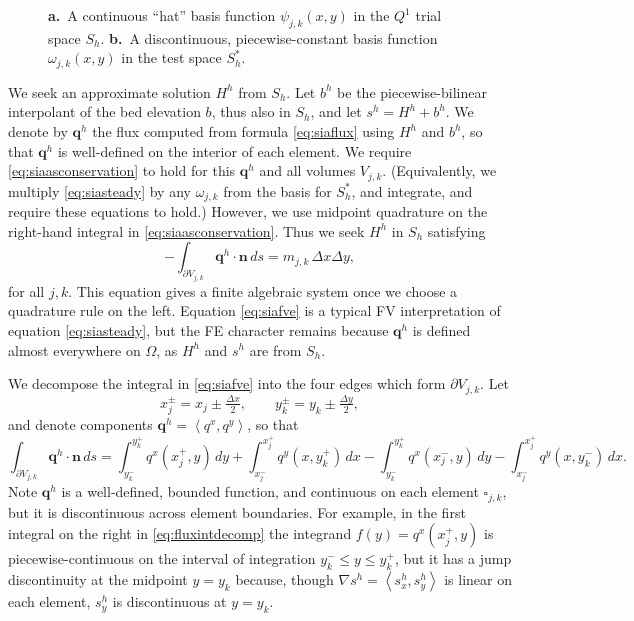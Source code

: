 \documentclass[11pt]{amsart}
\newcommand\bn{\mathbf{n}}
\newcommand\bq{\mathbf{q}}
\newcommand{\grad}{\nabla}
\newcommand{\ip}[2]{\ensuremath{\left<#1,#2\right>}}
\newcommand{\dxtwo}{\tfrac{\Delta x}{2}}
\newcommand{\dytwo}{\tfrac{\Delta y}{2}}
\begin{document}
\begin{figure}[ht]
\begin{center}
 \quad 
\end{center}
\caption{{\large \textbf{a.}}~A continuous ``hat'' basis function $\psi_{j,k}(x,y)$ in the $Q^1$ trial space $S_h$.  {\large \textbf{b.}}~A discontinuous, piecewise-constant basis function $\omega_{j,k}(x,y)$ in the test space $S_h^*$.}
\label{fig:fembases}
\end{figure}

We seek an approximate solution $H^h$ from $S_h$.  Let $b^h$ be the piecewise-bilinear interpolant of the bed elevation $b$, thus also in $S_h$, and let $s^h=H^h+b^h$.  We denote by $\bq^h$ the flux computed from formula \eqref{eq:siaflux} using $H^h$ and $b^h$, so that $\bq^h$ is well-defined on the interior of each element.  We require \eqref{eq:siaasconservation} to hold for this $\bq^h$ and all volumes $V_{j,k}$.  (Equivalently, we multiply \eqref{eq:siasteady} by any $\omega_{j,k}$ from the basis for $S_h^*$, and integrate, and require these equations to hold.)  However, we use midpoint quadrature on the right-hand integral in \eqref{eq:siaasconservation}.  Thus we seek $H^h$ in $S_h$ satisfying
\begin{equation}
  - \int_{\partial V_{j,k}} \bq^h \cdot \bn\,ds = m_{j,k}\, \Delta x \Delta y, \label{eq:siafve}
\end{equation}
for all $j,k$.  This equation gives a finite algebraic system once we choose a quadrature rule on the left.  Equation \eqref{eq:siafve} is a typical FV interpretation of equation \eqref{eq:siasteady}, but the FE character remains because $\bq^h$ is defined almost everywhere on $\Omega$, as $H^h$ and $s^h$ are from $S_h$.

We decompose the integral in \eqref{eq:siafve} into the four edges which form $\partial V_{j,k}$.  Let
\begin{equation}
x_j^\pm = x_j \pm \dxtwo, \qquad y_k^\pm = y_k \pm \dytwo, \label{eq:definexypm}
\end{equation}
and denote components $\bq^h = \ip{q^x}{q^y}$, so that
\begin{equation}
  \int_{\partial V_{j,k}} \bq^h \cdot \bn\,ds = \int_{y_k^-}^{y_k^+} q^x(x_j^+,y)\,dy + \int_{x_j^-}^{x_j^+} q^y(x,y_k^+)\,dx - \int_{y_k^-}^{y_k^+} q^x(x_j^-,y)\,dy - \int_{x_j^-}^{x_j^+} q^y(x,y_k^-)\,dx. \label{eq:fluxintdecomp}
\end{equation}
Note $\bq^h$ is a well-defined, bounded function, and continuous on each element $\square_{j,k}$, but it is discontinuous across element boundaries.  For example, in the first integral on the right in \eqref{eq:fluxintdecomp} the integrand $f(y) = q^x(x_j^+,y)$ is piecewise-continuous on the interval of integration $y_k^- \le y \le y_k^+$, but it has a jump discontinuity at the midpoint $y=y_k$ because, though $\grad s^h = \ip{s^h_x}{s^h_y}$ is linear on each element, $s^h_y$ is discontinuous at $y=y_k$.
\end{document}
